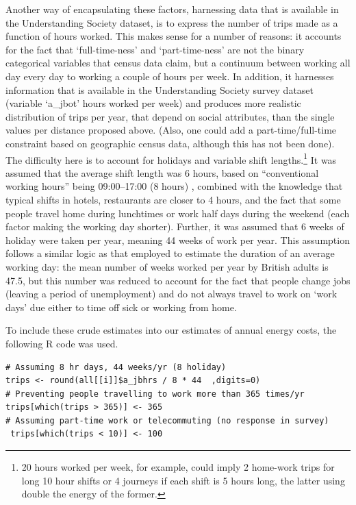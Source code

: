 Another way of encapsulating these
factors, harnessing data that is available in the Understanding Society dataset,
is to express the number of trips made as a function of hours worked.
This makes sense for a number of reasons: it accounts for the fact that
`full-time-ness' and `part-time-ness' are not the binary categorical variables
that census data claim, but a continuum between working all day every day to
working a couple of hours per week. In addition, it harnesses information that
is available in the Understanding Society survey dataset (variable `a\_jbot'
hours worked per week) and produces more realistic distribution of
trips per year, that depend on social attributes,
than the single values per distance proposed above. (Also, one could
add a part-time/full-time constraint based on geographic census data,
although this has not been done).
The difficulty here is to account for holidays and variable shift
lengths.\footnote{20
hours worked per week, for example, could
imply 2 home-work trips for long 10 hour shifts or 4 journeys if each
shift is 5 hours long, the latter using double the energy of the former.
}
It was assumed that the average shift length was 6 hours, based on
``conventional working hours'' being 09:00--17:00 (8 hours)
\citep{harrington2001health}, combined with the knowledge that typical shifts
in hotels, restaurants are closer to 4 hours, and the fact that some people
travel home during lunchtimes or work half days during the weekend (each
factor making the working day shorter).
Further, it was assumed that 6 weeks of holiday were taken per year,
meaning 44 weeks of work per year.
This assumption follows a similar logic as that employed to estimate
the duration of an average working day: the mean number of weeks worked per
year by British adults is 47.5, but this number was reduced to account for
the fact that people change jobs (leaving a period of unemployment) and
do not always travel to work on `work days' due either to time off sick
or working from home.

To include these crude estimates into our estimates of annual energy costs,
the following R code was used.
\begin{lstlisting}[float=h, caption={Code used to
translate hours worked per week into number of trips per year}, label=ctrpyr]
# Assuming 8 hr days, 44 weeks/yr (8 holiday)
trips <- round(all[[i]]$a_jbhrs / 8 * 44  ,digits=0)
# Preventing people travelling to work more than 365 times/yr
trips[which(trips > 365)] <- 365
# Assuming part-time work or telecommuting (no response in survey)
 trips[which(trips < 10)] <- 100
\end{lstlisting}

